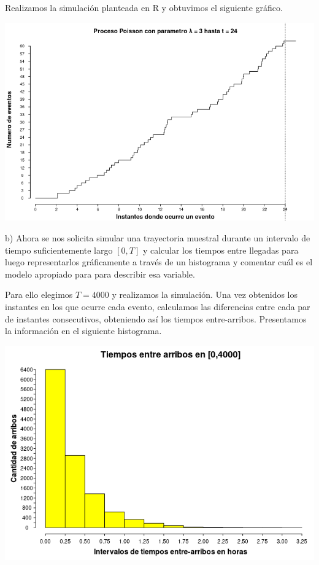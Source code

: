 \documentclass[11pt]{article}
\begin{document}
Realizamos la simulación planteada en R y obtuvimos el siguiente gráfico.

\begin{center}\includegraphics[scale = 0.67]{P6Sim.png}\end{center}

b) Ahora se nos solicita simular una trayectoria muestral durante un intervalo de tiempo suficientemente largo $[0,T]$ y calcular
los tiempos entre llegadas para luego representarlos gráficamente a través
de un histograma y comentar cuál es el modelo apropiado para para describir esa variable.

Para ello elegimos $T=4000$ y realizamos la simulación. Una vez obtenidos los instantes en los
que ocurre cada evento, calculamos las diferencias entre cada par de instantes consecutivos, obteniendo así los tiempos entre-arribos. Presentamos la información en el siguiente histograma. 

\begin{center}\includegraphics[scale = 0.65]{P6Histo.png}\end{center}
\end{document}
